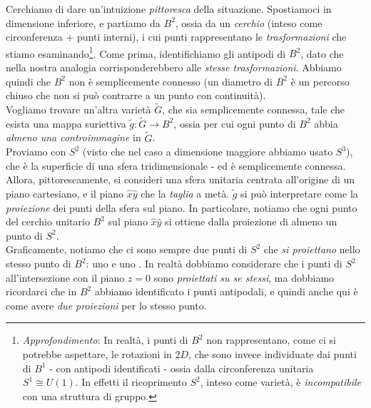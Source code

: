 \documentclass[../../FisicaTeorica.tex]{subfiles}
\begin{document}
Cerchiamo di dare un'intuizione \textit{pittoresca} della situazione. Spostiamoci in dimensione inferiore, e partiamo da $B^2$, ossia da un \textit{cerchio} (inteso come circonferenza + punti interni), i cui punti rappresentano le \textit{trasformazioni} che stiamo esaminando\footnote{\textit{Approfondimento}: In realtà, i punti di $B^2$ non rappresentano, come ci si potrebbe aspettare, le rotazioni in $2D$, che sono invece individuate dai punti di $B^1$ - con antipodi identificati - ossia dalla circonferenza unitaria $S^1 \cong U(1)$. In effetti il ricoprimento $S^2$, inteso come varietà, è \textit{incompatibile} con una struttura di gruppo.}.
Come prima, identifichiamo gli antipodi di $B^2$, dato che nella nostra analogia corrisponderebbero alle \textit{stesse trasformazioni}. Abbiamo quindi che $B^2$ non è semplicemente connesso (un diametro di $B^2$ è un percorso chiuso che non si può contrarre a un punto con continuità).\\
Vogliamo trovare un'altra varietà $\tilde{G}$, che sia semplicemente connessa, tale che esista una mappa suriettiva $\tilde{g}:\tilde{G}\to B^2$, ossia per cui ogni punto di $B^2$ abbia \textit{almeno una controimmagine} in $\tilde{G}$.\\
Proviamo con $S^2$ (visto che nel caso a dimensione maggiore abbiamo usato $S^3$), che è la superficie di una sfera tridimensionale - ed è semplicemente connessa.\\
Allora, pittorescamente, si consideri una sfera unitaria centrata all'origine di un piano cartesiano, e il piano $\hat{x}\hat{y}$ che la \textit{taglia} a metà. $\tilde{g}$ si può interpretare come la \textit{proiezione} dei punti della sfera sul piano. In particolare, notiamo che ogni punto del cerchio unitario $B^2$ sul piano $\hat{x}\hat{y}$ si ottiene dalla proiezione di almeno un punto di $S^2$.\\
Graficamente, notiamo che ci sono sempre due punti di $S^2$ che \textit{si proiettano} nello stesso punto di $B^2$: uno  e uno . In realtà dobbiamo considerare che i punti di $S^2$ all'intersezione con il piano $z=0$ sono \textit{proiettati su se stessi}, ma dobbiamo ricordarci che in $B^2$ abbiamo identificato i punti antipodali, e quindi anche qui è come avere \textit{due proiezioni} per lo stesso punto.
\end{document}
